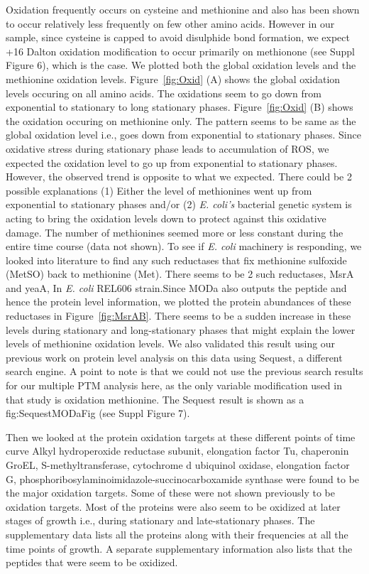 \documentclass[12pt]{article}
\begin{document}
Oxidation frequently occurs on cysteine and methionine and also has been shown to occur relatively less frequently on few other amino acids. However in our sample, since cysteine is capped to avoid disulphide bond formation, we expect +16 Dalton oxidation modification to occur primarily on methionone (see Suppl Figure 6), which is the case. We plotted both the global oxidation levels and the methionine oxidation levels. Figure~\ref{fig:Oxid} (A) shows the global oxidation levels occuring on all amino acids. The oxidations seem to go down from exponential to stationary to long stationary phases. Figure~\ref{fig:Oxid} (B) shows the oxidation occuring on methionine only. The pattern seems to be same as the global oxidation level i.e., goes down from exponential to stationary phases. Since oxidative stress during stationary phase leads to accumulation of ROS, we expected the oxidation level to go up from exponential to stationary phases. However, the observed trend is opposite to what we expected. There could be 2 possible explanations (1) Either the level of methionines went up from exponential to stationary phases and/or (2) \emph{E. coli's} bacterial genetic system is acting to bring the oxidation levels down to protect against this oxidative damage. The number of methionines seemed more or less constant during the entire time course (data not shown). To see if \emph{E. coli} machinery is responding, we looked into literature to find any such reductases that fix methionine sulfoxide (MetSO) back to methionine (Met).  There seems to be 2 such reductases, MsrA and yeaA, In \emph{E. coli} REL606 strain.Since MODa also outputs the peptide and hence the protein level information, we plotted the protein abundances of these reductases in Figure~\ref{fig:MsrAB}. There seems to be a sudden increase in these levels during stationary and long-stationary phases that might explain the lower levels of methionine oxidation levels. We also validated this result using our previous work \cite{Houseretal2015} on protein level analysis on this data using Sequest, a different search engine. A point to note is that we  could not use the previous search results for our multiple PTM analysis here, as the only variable modification used in that study is oxidation methionine. The Sequest result is shown as a fig:SequestMODaFig (see Suppl Figure 7).

Then we looked at the protein oxidation targets at these different points of time curve Alkyl hydroperoxide reductase subunit, elongation factor Tu, chaperonin GroEL, S-methyltransferase, cytochrome d ubiquinol oxidase, elongation factor G, phosphoribosylaminoimidazole-succinocarboxamide synthase were found to be the major oxidation targets. Some of these were not shown previously to be oxidation targets. Most of the proteins were also seem to be oxidized at later stages of growth i.e., during stationary and late-stationary phases. The supplementary data lists all the proteins along with their frequencies at all the time points of growth. A separate supplementary information also lists that the peptides that were seem to be oxidized.
\end{document}
